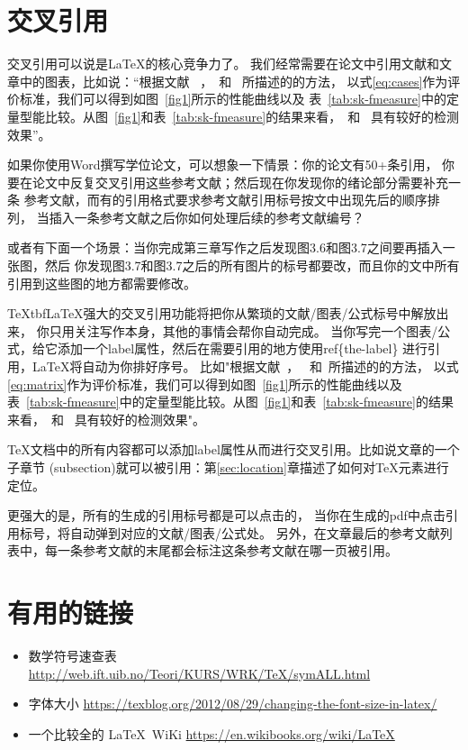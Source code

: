 \documentclass[UTF8, fontset=windows]{ctexart}
\numberwithin{equation}{section} %
\numberwithin{table}{section} %
\begin{document}
\section{交叉引用}\label{sec:ref}
交叉引用可以说是\LaTeX 的核心竞争力了。
我们经常需要在论文中引用文献和文章中的图表，比如说：“根据文献
~\cite{shen2017label}，~\cite{shen2016object}和~\cite{shen2017deepskeleton}
所描述的的方法，
以式\ref{eq:cases}作为评价标准，我们可以得到如图~\ref{fig1}所示的性能曲线以及
表~\ref{tab:sk-fmeasure}中的定量型能比较。从图~\ref{fig1}和表~\ref{tab:sk-fmeasure}的结果来看，~\cite{shen2016object}和~\cite{shen2017deepskeleton}
具有较好的检测效果”。

如果你使用Word撰写学位论文，可以想象一下情景：你的论文有50+条引用，
你要在论文中反复交叉引用这些参考文献；然后现在你发现你的绪论部分需要补充一条
参考文献，而有的引用格式要求参考文献引用标号按文中出现先后的顺序排列，
当插入一条参考文献之后你如何处理后续的参考文献编号？


或者有下面一个场景：当你完成第三章写作之后发现图3.6和图3.7之间要再插入一张图，然后
你发现图3.7和图3.7之后的所有图片的标号都要改，而且你的文中所有引用到这些图的地方都需要修改。

\TeX tbf{\LaTeX 强大的交叉引用功能}将把你从繁琐的文献/图表/公式标号中解放出来，
你只用关注写作本身，其他的事情会帮你自动完成。
%
当你写完一个图表/公式，给它添加一个label属性，然后在需要引用的地方使用ref\{the-label\}
进行引用，\LaTeX 将自动为你排好序号。
%
比如"根据文献~\cite{shen2017label}，~\cite{shen2016object}
和~\cite{shen2017deepskeleton}所描述的的方法，
以式\ref{eq:matrix}作为评价标准，我们可以得到如图~\ref{fig1}所示的性能曲线以及
表~\ref{tab:sk-fmeasure}中的定量型能比较。从图~\ref{fig1}和表~\ref{tab:sk-fmeasure}的结果来看，~\cite{shen2016object}和~\cite{shen2017deepskeleton}
具有较好的检测效果"。

\TeX 文档中的所有内容都可以添加label属性从而进行交叉引用。比如说文章的一个子章节
(subsection)就可以被引用：第\ref{sec:location}章描述了如何对\TeX 元素进行定位。

更强大的是，所有的生成的引用标号都是可以点击的，
当你在生成的pdf中点击引用标号，将自动弹到对应的文献/图表/公式处。
%
另外，在文章最后的参考文献列表中，每一条参考文献的末尾都会标注这条参考文献在哪一页被引用。

%


\section{有用的链接}
\begin{itemize}
  \item 数学符号速查表 \url{http://web.ift.uib.no/Teori/KURS/WRK/TeX/symALL.html}
  \item 字体大小 \url{https://texblog.org/2012/08/29/changing-the-font-size-in-latex/}
  \item 一个比较全的 \LaTeX  \ WiKi \url{https://en.wikibooks.org/wiki/LaTeX}
\end{itemize}
\end{document}
